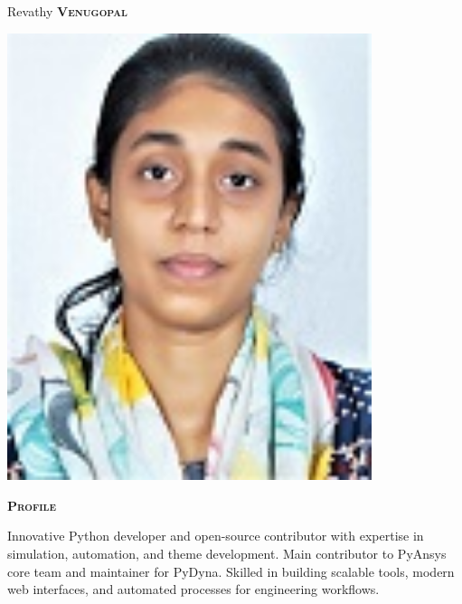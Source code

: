 \documentclass[11pt, a4paper]{article}
\newcommand{\headleft}[1]{\vspace*{3ex}\textsc{\textbf{#1}}\par%
    \vspace*{-1.5ex}\hrulefill\par\vspace*{0.7ex}}
\begin{document}
\setlength{\topskip}{0pt}
\setlength{\parindent}{0pt}
\setlength{\parskip}{0pt}
\setlength{\fboxsep}{0pt}
\pagestyle{empty}
\raggedbottom

\begin{minipage}[t]{0.33\textwidth} %
\colorbox{cvblue}{\begin{minipage}[t][5mm][t]{\textwidth}\null\hfill\null\end{minipage}}

\vspace{-.2ex} %
\colorbox{cvblue!90}{\color{white}  %
\textwidth\relax%
\begin{minipage}[t][293mm][t]{0.82\textwidth}
\raggedright
\vspace*{2.5ex}

\Large Revathy \textbf{\textsc{Venugopal}} \normalsize 

\null\hfill\includegraphics[width=0.80\textwidth]{../assets/revathy.jpg}\hfill\null

\vspace*{0.5ex} %

\headleft{Profile}
Innovative Python developer and open-source contributor with expertise in simulation, automation, and theme development. Main contributor to PyAnsys core team and maintainer for PyDyna. Skilled in building scalable tools, modern web interfaces, and automated processes for engineering workflows.


\end{minipage}}
\end{minipage}
\end{document}
